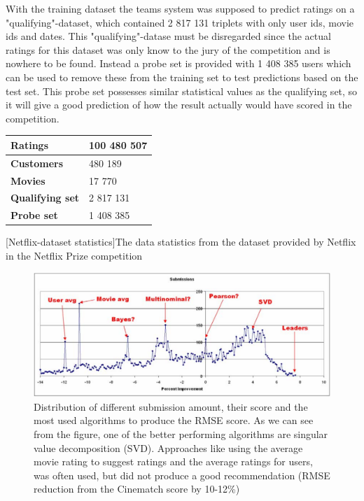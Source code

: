 With the training dataset the teams system was supposed to predict ratings on a "qualifying"-dataset, which contained 2 817 131 triplets with only user ids, movie ids and dates. This "qualifying"-datase must be disregarded since the actual ratings for this dataset was only know to the jury of the competition and is nowhere to be found. Instead a probe set is provided with 1 408 385 users which can be used to remove these from the training set to test predictions based on the test set. This probe set possesses similar statistical values as the qualifying set, so it will give a good prediction of how the result actually would have scored in the competition\cite{nfprizeset}.

\begin{table}[H]
\centering
\begin{tabular}{ l l }
\hline
\textbf{Ratings} & 100 480 507 \\ \hline
\textbf{Customers} & 480 189 \\ \hline
\textbf{Movies} & 17 770 \\ \hline
\textbf{Qualifying set} & 2 817 131 \\ \hline
\textbf{Probe set} & 1 408 385 \\ \hline
\end{tabular}
[Netflix-dataset statistics]{The data statistics from the dataset provided by Netflix in the Netflix Prize competition}\label{tab:nfDatasetStat}
\end{table}

\begin{figure}[H]
\includegraphics[width=5in]{image/sub-distr-nf.png}
\centering
\caption[Distribution of different submission]{Distribution of different submission amount, their score and the most used algorithms to produce the RMSE score. As we can see from the figure, one of the better performing algorithms are singular value decomposition (SVD). Approaches like using the average movie rating to suggest ratings and the average ratings for users, was often used, but did not produce a good recommendation (RMSE reduction from the Cinematch score by 10-12\%)}
\label{figure:sub-distr-nf}
\end{figure}

